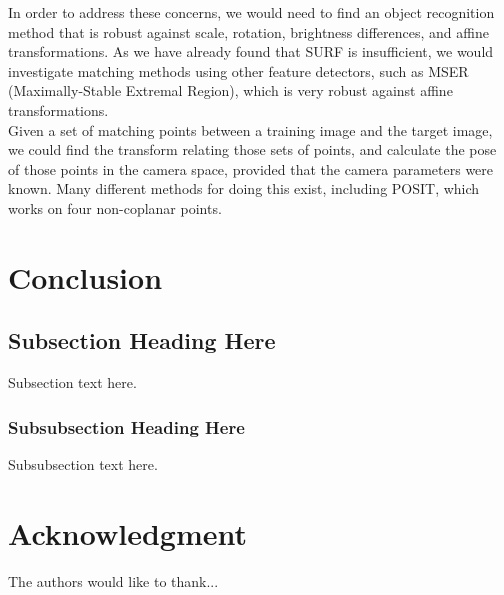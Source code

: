\documentclass[conference]{IEEEtran}
\begin{document}
In order to address these concerns, we would need to find an object recognition method that is robust against scale, rotation, brightness differences, and affine transformations.  As we have already found that SURF is insufficient, we would investigate matching methods using other feature detectors, such as MSER (Maximally-Stable Extremal Region), which is very robust against affine transformations.\\

Given a set of matching points between a training image and the target image, we could find the transform relating those sets of points, and calculate the pose of those points in the camera space, provided that the camera parameters were known.  Many different methods for doing this exist, including POSIT, which works on four non-coplanar points.


\section{Conclusion}


\subsection{Subsection Heading Here}
Subsection text here.


\subsubsection{Subsubsection Heading Here}
Subsubsection text here.






\section*{Acknowledgment}


The authors would like to thank...






\end{document}
